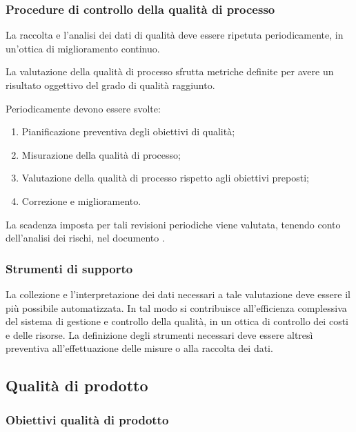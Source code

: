 \documentclass[12pt,a4paper]{article}
\begin{document}
\subsubsection{Procedure di controllo della qualità di processo}
La raccolta e l'analisi dei dati di qualità deve essere ripetuta periodicamente, in un'ottica di miglioramento continuo. 

La valutazione della qualità di processo sfrutta metriche  definite per avere un risultato oggettivo del grado di qualità raggiunto.

Periodicamente devono essere svolte:
\begin{enumerate}
	\item Pianificazione preventiva degli obiettivi di qualità;
	\item Misurazione della qualità di processo;
	\item Valutazione della qualità di processo rispetto agli obiettivi preposti;
	\item Correzione e miglioramento.
\end{enumerate}
La scadenza imposta per tali revisioni periodiche viene valutata, tenendo  conto dell'analisi dei rischi, nel documento \PdP{}.

\subsubsection{Strumenti di supporto}
La collezione e l'interpretazione dei dati necessari a tale valutazione deve essere il più possibile automatizzata. In tal modo si contribuisce all'efficienza complessiva del sistema di gestione e controllo della qualità, in un ottica di controllo dei costi e delle risorse.
La definizione degli strumenti necessari deve essere altresì preventiva all'effettuazione delle misure o alla raccolta dei dati.


\subsection{Qualità di prodotto}

\subsubsection{Obiettivi qualità di prodotto}
\end{document}
